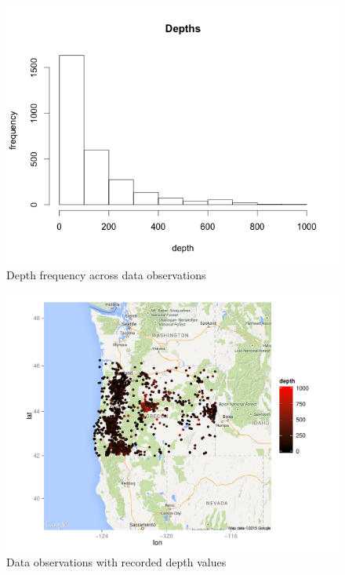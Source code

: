 \documentclass[12pt,twoside]{reedthesis}
\begin{document}
\begin{figure}[h]
	   
	       \centering
	  
	    \includegraphics[scale=0.6]{depth_hist}
	
	     \caption{Depth frequency across data observations}
	 \label{depths}
	\end{figure}

\begin{figure}[h]
	   
	       \centering
	  
	    \includegraphics[scale=0.8]{points_plot}
	
	     \caption{Data observations with recorded depth values}
	 \label{points}
	\end{figure}
\end{document}
